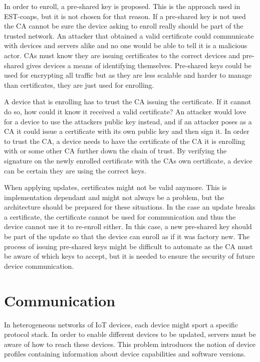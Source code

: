 \documentclass[0-thesis.tex]{subfiles}
\begin{document}
In order to enroll, a pre-shared key is proposed. This is the approach used in EST-coaps,
but it is not chosen for that reason. If a pre-shared key is not used the CA cannot be
sure the device asking to enroll really should be part of the trusted network. An attacker
that obtained a valid certificate could communicate with devices and servers alike and no
one would be able to tell it is a malicious actor. CAs must know they are issuing
certificates to the correct devices and pre-shared gives devices a means of identifying
themselves. Pre-shared keys could be used for encrypting all traffic but as they are less
scalable and harder to manage than certificates, they are just used for enrolling.

A device that is enrolling has to trust the CA issuing the certificate. If it cannot do
so, how could it know it received a valid certificate? An attacker would love for a device
to use the attackers public key instead, and if an attacker poses as a CA it could issue a
certificate with its own public key and then sign it. In order to trust the CA, a device
needs to have the certificate of the CA it is enrolling with or some other CA further down
the chain of trust. By verifying the signature on the newly enrolled certificate with the
CAs own certificate, a device can be certain they are using the correct keys.

When applying updates, certificates might not be valid anymore. This is implementation
dependant and might not always be a problem, but the architecture should be prepared for
these situations. In the case an update breaks a certificate, the certificate cannot be
used for communication and thus the device cannot use it to re-enroll either. In this
case, a new pre-shared key should be part of the update so that the device can enroll as
if it was factory new. The process of issuing pre-shared keys might be difficult to
automate as the CA must be aware of which keys to accept, but it is needed to ensure the
security of future device communication.

\section{Communication}
\label{sec:communication}
In heterogeneous networks of IoT devices, each device might sport a specific protocol
stack. In order to enable different devices to be updated, servers must be aware of how to
reach these devices. This problem introduces the notion of device profiles containing
information about device capabilities and software versions. 
\end{document}
